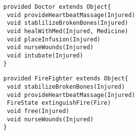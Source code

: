\pagebreak
\begin{lstlisting}[style = dsl, caption = Deklaration von Doctor, captionpos = b, label = lst_doctor]
provided Doctor extends Object{
 void provideHeartbeatMassage(Injured)
 void stablilizeBrokenBones(Injured)
 void healWithMed(Injured, Medicine)
 void placeInfusion(Injured)
 void nurseWounds(Injured)
 void intubate(Injured)
}
\end{lstlisting}
\begin{lstlisting}[style = dsl, caption = Deklaration von FireFighter, captionpos = b, label = lst_firefighter]
provided FireFighter extends Object{
 void stabilizeBrokenBones(Injured)
 void provideHeartbeatMassage(Injured)
 FireState extinguishFire(Fire)
 void free(Injured)
 void nurseWounds(Injured)
}
\end{lstlisting}
